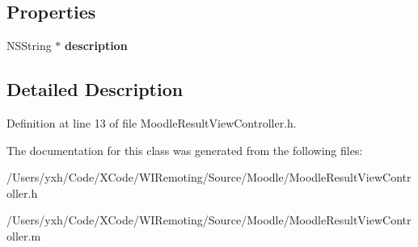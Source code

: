 \subsection*{Properties}
\begin{DoxyCompactItemize}
\item 
\hypertarget{interface_moodle_result_view_controller_a13d3bc5fc3ed6c81f36fe164e83abc37}{
NSString $\ast$ {\bfseries description}}
\label{interface_moodle_result_view_controller_a13d3bc5fc3ed6c81f36fe164e83abc37}

\end{DoxyCompactItemize}


\subsection{Detailed Description}


Definition at line 13 of file MoodleResultViewController.h.

The documentation for this class was generated from the following files:\begin{DoxyCompactItemize}
\item 
/Users/yxh/Code/XCode/WIRemoting/Source/Moodle/MoodleResultViewController.h\item 
/Users/yxh/Code/XCode/WIRemoting/Source/Moodle/MoodleResultViewController.m\end{DoxyCompactItemize}
